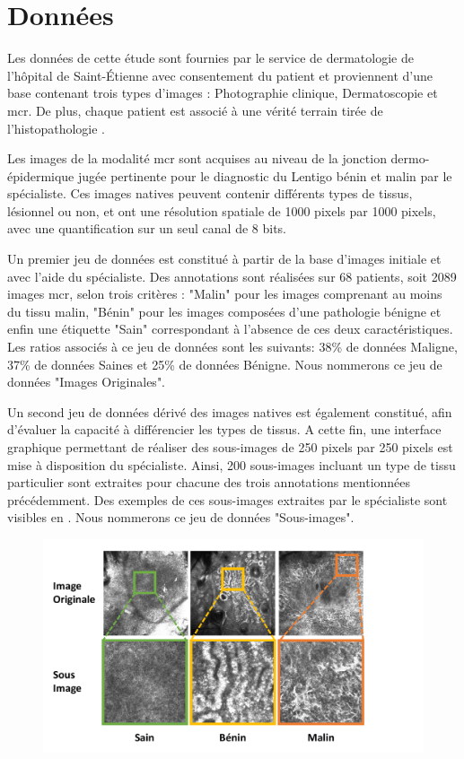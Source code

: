 \documentclass{gretsi}
\begin{document}
\begin{sloppypar}
\section{Données}
\label{donnee}
Les données de cette étude sont fournies par le service de dermatologie de l'hôpital de Saint-Étienne avec consentement du patient et proviennent d'une base contenant trois types d’images : Photographie clinique, Dermatoscopie et \ac{mcr}. De plus, chaque patient est associé à une vérité terrain tirée de l’histopathologie \cite{Cinotti2018}.\par
Les images de la modalité \ac{mcr} sont acquises au niveau de la jonction dermo-épidermique jugée pertinente pour le diagnostic du Lentigo bénin et malin par le spécialiste. Ces images natives peuvent contenir différents types de tissus, lésionnel ou non, et ont une résolution spatiale de 1000 pixels par 1000 pixels, avec une quantification sur un seul canal de 8 bits.\par
Un premier jeu de données est constitué à partir de la base d'images initiale et avec l’aide du spécialiste. Des annotations sont réalisées sur 68 patients, soit 2089 images \ac{mcr}, selon trois critères : "Malin" pour les images comprenant au moins du tissu malin, "Bénin" pour les images composées d'une pathologie bénigne et enfin une étiquette "Sain" correspondant à l'absence de ces deux caractéristiques. Les ratios associés à ce jeu de données sont les suivants: 38\% de données Maligne, 37\% de données Saines et 25\% de données Bénigne. Nous nommerons ce jeu de données "Images Originales".\par
Un second jeu de données dérivé des images natives est également constitué, afin d'évaluer la capacité à différencier les types de tissus. A cette fin, une interface graphique permettant de réaliser des sous-images de 250 pixels par 250 pixels est mise à disposition du spécialiste. Ainsi, 200 sous-images incluant un type de tissu particulier sont extraites pour chacune des trois annotations mentionnées précédemment. Des exemples de ces sous-images extraites par le spécialiste sont visibles en . Nous nommerons ce jeu de données "Sous-images".\par
\begin{figure}[h]
    \begin{center} 
        \includegraphics[width=0.9\linewidth]{content/figures/Donnees.pdf}
        \label{donnees}
    \end{center} 
\end{figure}

\end{sloppypar}
\end{document}
